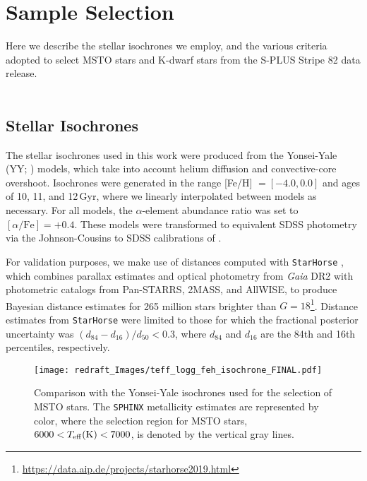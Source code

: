 \documentclass[twocolumn,trackchanges]{aastex63}
\begin{document}
\section{Sample Selection}\label{section:sample_selections}

Here we describe the stellar isochrones we employ, and the various criteria adopted to select MSTO stars and K-dwarf stars from the S-PLUS Stripe 82 data release.\\
\\
\subsection{Stellar Isochrones}

The stellar isochrones used in this work were produced from the Yonsei-Yale (YY; \citealt{YY:2004}) models, which take into account helium diffusion and convective-core overshoot. Isochrones were generated in the range [Fe/H] $= [-4.0, 0.0]$ and ages of 10, 11, and 12\,Gyr, where we linearly interpolated between models as necessary. For all models, the $\alpha$-element abundance ratio was set to $[\alpha/\textrm{Fe}] = +0.4$. These models were transformed to equivalent SDSS photometry via the Johnson-Cousins to SDSS calibrations of \citet{Jordi_2006}. 

For validation purposes, we make use of distances computed with \texttt{StarHorse} \citep{starhorse}, which combines parallax estimates and optical photometry from \textit{Gaia} DR2 with photometric catalogs from Pan-STARRS, 2MASS, and AllWISE, to produce Bayesian distance estimates for 265 million stars brighter than $G=18$\footnote{\href{https://data.aip.de/projects/starhorse2019.html}{https://data.aip.de/projects/starhorse2019.html}}. Distance estimates from \texttt{StarHorse} were limited to those for which the fractional posterior uncertainty was $(d_{84} - d_{16})/d_{50} < 0.3$, where $d_{84}$ and $d_{16}$ are the 84th and 16th percentiles, respectively.

\begin{figure}
	\centering
	\texttt{[image: redraft\_Images/teff\_logg\_feh\_isochrone\_FINAL.pdf]}
	
	\caption{Comparison with the Yonsei-Yale isochrones used for the selection of MSTO stars. The \texttt{SPHINX} metallicity estimates are represented by color, where the selection region for MSTO stars, $6000 < T_{\rm{eff}}\textrm{(K)} < 7000$, is denoted by the vertical gray lines. \label{fig:MSTO_selection}}
\end{figure}
\end{document}
